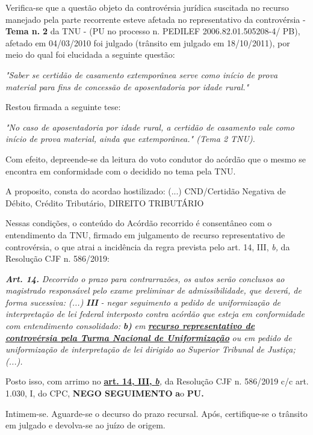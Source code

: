 \documentclass[12pt]{article}
\begin{document}
\justifying
\noindent Verifica-se que a questão objeto da controvérsia jurídica suscitada no recurso manejado pela parte recorrente esteve afetada no representativo da controvérsia - \textbf{Tema n. }\textbf{2} da TNU - (PU no processo n. PEDILEF 2006.82.01.505208-4/ PB),  afetado em 04/03/2010 foi julgado (trânsito em julgado em 18/10/2011), por meio do qual foi elucidada a seguinte questão:

\noindent \textit{"Saber se certidão de casamento extemporânea serve como início de prova material para fins de concessão de aposentadoria por idade rural."}

\noindent Restou firmada a seguinte tese:

\noindent \textit{"No caso de aposentadoria por idade rural, a certidão de casamento vale como início de prova material, ainda que extemporânea." (Tema 2 TNU).}

\noindent Com efeito, depreende-se da leitura do voto condutor do acórdão que o mesmo se encontra em conformidade com o decidido no  tema pela TNU.

\noindent A proposito, consta do acordao hostilizado: (...) CND/Certidão Negativa de Débito, Crédito Tributário, DIREITO TRIBUTÁRIO

\noindent Nessas condições, o conteúdo do Acórdão recorrido é consentâneo com o entendimento da TNU, firmado em julgamento de recurso representativo de controvérsia, o que atrai a incidência da regra prevista pelo art. 14, III, \textit{b,} da Resolução CJF n. 586/2019:

\noindent \textit{\textbf{Art. 14.}}\textit{ Decorrido o prazo para contrarrazões, os autos serão conclusos ao magistrado responsável pelo exame preliminar de admissibilidade, que deverá, de forma sucessiva: (...) }\textit{\textbf{III }}\textit{- negar seguimento a pedido de uniformização de interpretação de lei federal interposto contra acórdão que esteja em conformidade com entendimento consolidado: }\textit{\textbf{b)}}\textit{ em }\uline{\textit{\textbf{recurso representativo de controvérsia pela Turma Nacional de Uniformização}}}\textit{ ou em pedido de uniformização de interpretação de lei dirigido ao Superior Tribunal de Justiça;(...).}

\noindent Posto isso, com arrimo no \uline{\textbf{art. 14, III, }}\uline{\textit{\textbf{b}}}\textit{,} da Resolução CJF n. 586/2019 c/c art. 1.030, I, do CPC, \textbf{NEGO SEGUIMENTO }\textbf{a}o\textbf{ PU}\textbf{.}

\noindent Intimem-se. Aguarde-se o decurso do prazo recursal. Após, certifique-se o trânsito em julgado e devolva-se ao juízo de origem.
\end{document}

